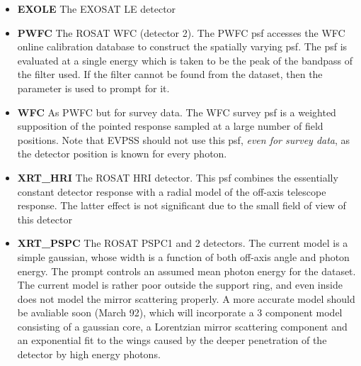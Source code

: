 \begin{itemize}
\item {\bf EXOLE} The EXOSAT LE detector \\ 
\item {\bf PWFC} The ROSAT WFC (detector 2). The PWFC psf accesses the WFC
online calibration database to construct the spatially 
varying psf. The psf is evaluated at a single energy which is 
taken to be the peak of the bandpass of the filter used. If 
the filter cannot be found from the dataset, then the 
parameter is used to prompt for it. \\ 
\item {\bf WFC} As PWFC but for survey data. The WFC survey psf is a 
weighted supposition of the pointed response sampled 
at a large number of field positions. Note that EVPSS 
should not use this psf, {\em even for survey data}, as
the detector position is known for every photon. \\ 
\item {\bf XRT\_HRI} The ROSAT HRI detector. This psf combines the 
essentially constant detector response with a radial model of the 
off-axis telescope response. The latter effect is not 
significant due to the small field of view of this detector \\ 
\item {\bf XRT\_PSPC} The ROSAT PSPC1 and 2 detectors. The current model 
is a simple gaussian, whose width is a function of both off-axis 
angle and photon energy. The  prompt controls an 
assumed mean photon energy for the dataset. The current 
model is rather poor outside the support ring, and even 
inside does not model the mirror scattering properly. A more
accurate model should be avaliable soon (March 92), which 
will incorporate a 3 component model consisting of a gaussian 
core, a Lorentzian mirror scattering component and an 
exponential fit to the wings caused by the
deeper penetration of the detector by high energy photons. \\ 
\end{itemize}

